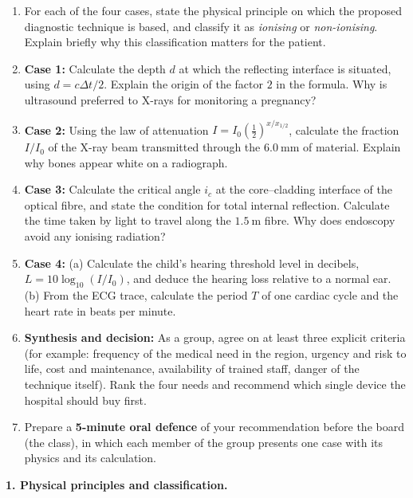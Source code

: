 \documentclass[11pt]{article}
\newcounter{popsec}
\newcounter{popsub}
\newcommand{\courssub}[1]{%
  \stepcounter{popsub}%
  \par\vspace{9pt}\noindent{\popxbold\fontsize{11.5}{13}\selectfont\color{popink}{\color{poporange}\thepopsec.\thepopsub}\hspace{6pt}#1}\par\nopagebreak\vspace{4pt}
}
\begin{document}
\begin{enumerate}
\item For each of the four cases, state the physical principle on which the proposed diagnostic technique is based, and classify it as \emph{ionising} or \emph{non-ionising}. Explain briefly why this classification matters for the patient.
\item \textbf{Case 1:} Calculate the depth $d$ at which the reflecting interface is situated, using $d = c\Delta t/2$. Explain the origin of the factor $2$ in the formula. Why is ultrasound preferred to X-rays for monitoring a pregnancy?
\item \textbf{Case 2:} Using the law of attenuation $I = I_0\left(\tfrac{1}{2}\right)^{x/x_{1/2}}$, calculate the fraction $I/I_0$ of the X-ray beam transmitted through the $6.0\ \mathrm{mm}$ of material. Explain why bones appear white on a radiograph.
\item \textbf{Case 3:} Calculate the critical angle $i_c$ at the core--cladding interface of the optical fibre, and state the condition for total internal reflection. Calculate the time taken by light to travel along the $1.5\ \mathrm{m}$ fibre. Why does endoscopy avoid any ionising radiation?
\item \textbf{Case 4:} (a) Calculate the child's hearing threshold level in decibels, $L = 10\log_{10}(I/I_0)$, and deduce the hearing loss relative to a normal ear. (b) From the ECG trace, calculate the period $T$ of one cardiac cycle and the heart rate in beats per minute.
\item \textbf{Synthesis and decision:} As a group, agree on at least three explicit criteria (for example: frequency of the medical need in the region, urgency and risk to life, cost and maintenance, availability of trained staff, danger of the technique itself). Rank the four needs and recommend which single device the hospital should buy first.
\item Prepare a \textbf{5-minute oral defence} of your recommendation before the board (the class), in which each member of the group presents one case with its physics and its calculation.
\end{enumerate}

\courssub{Model answer}

\textbf{1. Physical principles and classification.}
\end{document}
